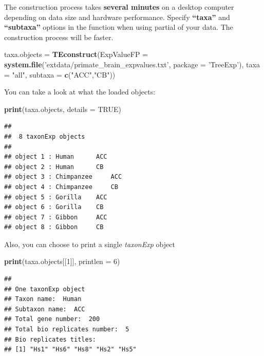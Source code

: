 \documentclass[]{book}
\newenvironment{Shaded}{\begin{snugshade}}{\end{snugshade}}
\newcommand{\DataTypeTok}[1]{\textcolor[rgb]{0.13,0.29,0.53}{#1}}
\newcommand{\DecValTok}[1]{\textcolor[rgb]{0.00,0.00,0.81}{#1}}
\newcommand{\KeywordTok}[1]{\textcolor[rgb]{0.13,0.29,0.53}{\textbf{#1}}}
\newcommand{\NormalTok}[1]{#1}
\newcommand{\OtherTok}[1]{\textcolor[rgb]{0.56,0.35,0.01}{#1}}
\newcommand{\StringTok}[1]{\textcolor[rgb]{0.31,0.60,0.02}{#1}}
\begin{document}
The construction process takes \textbf{several minutes} on a desktop computer depending on data size and hardware performance. Specify \textbf{``taxa''} and \textbf{``subtaxa''} options in the function when using partial of your data. The construction process will be faster.

\begin{Shaded}
\begin{Highlighting}[]
\NormalTok{taxa.objects =}\StringTok{ }\KeywordTok{TEconstruct}\NormalTok{(}\DataTypeTok{ExpValueFP =} \KeywordTok{system.file}\NormalTok{(}\StringTok{'extdata/primate_brain_expvalues.txt'}\NormalTok{,}
\DataTypeTok{package =} \StringTok{'TreeExp'}\NormalTok{), }\DataTypeTok{taxa =} \StringTok{"all"}\NormalTok{, }\DataTypeTok{subtaxa =} \KeywordTok{c}\NormalTok{(}\StringTok{"ACC"}\NormalTok{,}\StringTok{"CB"}\NormalTok{))}
\end{Highlighting}
\end{Shaded}

You can take a look at what the loaded objects:

\begin{Shaded}
\begin{Highlighting}[]
\KeywordTok{print}\NormalTok{(taxa.objects, }\DataTypeTok{details =} \OtherTok{TRUE}\NormalTok{)}
\end{Highlighting}
\end{Shaded}

\begin{verbatim}
## 
##  8 taxonExp objects 
## 
## object 1 : Human      ACC 
## object 2 : Human      CB 
## object 3 : Chimpanzee     ACC 
## object 4 : Chimpanzee     CB 
## object 5 : Gorilla    ACC 
## object 6 : Gorilla    CB 
## object 7 : Gibbon     ACC 
## object 8 : Gibbon     CB
\end{verbatim}

Also, you can choose to print a single \emph{taxonExp} object

\begin{Shaded}
\begin{Highlighting}[]
\KeywordTok{print}\NormalTok{(taxa.objects[[}\DecValTok{1}\NormalTok{]], }\DataTypeTok{printlen =} \DecValTok{6}\NormalTok{)}
\end{Highlighting}
\end{Shaded}

\begin{verbatim}
## 
## One taxonExp object
## Taxon name:  Human 
## Subtaxon name:  ACC 
## Total gene number:  200 
## Total bio replicates number:  5 
## Bio replicates titles:
## [1] "Hs1" "Hs6" "Hs8" "Hs2" "Hs5"
\end{verbatim}
\end{document}
